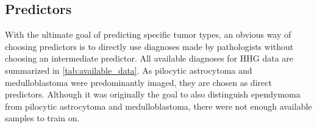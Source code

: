 \subsection{Predictors}
With the ultimate goal of predicting specific tumor types, an obvious way of choosing predictors is to directly use diagnoses made by pathologists without choosing an intermediate predictor.
All available diagnoses for HHG data are summarized in \cref{tab:available_data}.
As pilocytic astrocytoma and medulloblastoma were predominantly imaged, they are chosen as direct predictors.
Although it was originally the goal to also distinguish ependymoma from pilocytic astrocytoma and medulloblastoma, there were not enough available samples to train on.
